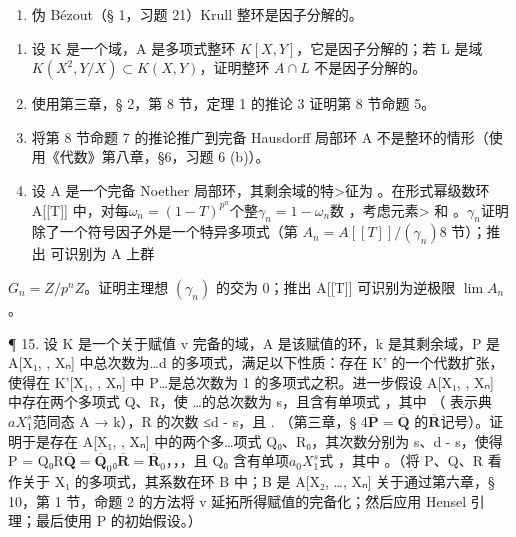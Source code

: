 \begin{enumerate}
\def\labelenumi{(\alph{enumi})}
\setcounter{enumi}{1}
\tightlist
\item
  伪 Bézout（§ 1，习题 21）Krull 整环是因子分解的。
\end{enumerate}

\begin{enumerate}
\def\labelenumi{\arabic{enumi}.}
\setcounter{enumi}{10}
\item
  设 K 是一个域，A 是多项式整环 \(K[X,Y]\)，它是因子分解的；若 L 是域 \(K(X^{2},Y/X) \subset K(X,Y)\)，证明整环 \(A \cap L\) 不是因子分解的。
\item
  使用第三章，§ 2，第 8 节，定理 1 的推论 3 证明第 8 节命题 5。
\item
  将第 8 节命题 7 的推论推广到完备 Hausdorff 局部环 A 不是整环的情形（使用《代数》第八章，§6，习题 6 (b)）。
\item
  设 A 是一个完备 Noether 局部环，其剩余域的特\textgreater{}征为 。在形式幂级数环 A[{}{}[{}{}T]] 中，对每\(\omega_{n} = (1 - T)^{p^{n}}\)个整\(\gamma_{n} = 1 - \omega_{n}\)数 ，考虑元素\textgreater{}  和 。\(\gamma_{n}\)证明  除了一个符号因子外是一个特异多项式（第 \(A_{n} = A[[T]]/(\gamma_{n})\)8 节）；推出  可识别为 A 上群
\end{enumerate}

\(G_{n} = Z/p^{n}Z\)。证明主理想 \((\gamma_{n})\) 的交为 0；推出 A{[}{[}T{]}{]} 可识别为逆极限 \(\lim A_{n}\)。

¶ 15. 设 K 是一个关于赋值 v 完备的域，A 是该赋值的环，k 是其剩余域，P 是 A[X₁, , Xₙ] 中总次{}数为\ldots d{} 的多项式，满足以下性质：存在 K' 的一个代数扩张，使得在 K'[X₁, , Xₙ] 中{} P\ldots {是}总次数为 1 的多项式之积。进一步假设 A[X₁, , Xₙ] 中存在两个多项式 Q、R，{}使 \ldots {}的总次数为 s，且含有单项式 ，其中 （ 表示典\(aX_1^{s}\)范同态 A → k），R 的次数 ≤d - s，且  . （第三章，§ 4\(\overline{\mathbf{P}} = \overline{\mathbf{Q}}\) 的\(\overline{\mathbf{R}}\)记号）。证明于是存在 A[X₁, , Xₙ] 中的两{个}多\ldots 项式{} Q₀、R₀，其次数分别为 s、d - s，使得 P = Q₀R\(\overline{\mathbf{Q}} = \overline{\mathbf{Q}}_0\)₀\(\overline{\mathbf{R}} = \overline{\mathbf{R}}_0\)，，，且 Q₀ 含有单项\(a_0X_1^{s}\)式 ，其中 。（将 P、Q、R 看作关于 X₁ 的多项式，其系数在环 B 中；B 是 A[X₂{}, \ldots, {}Xₙ] 关于通过第六章，§ 10，第 1 节，命题 2 的方法将 v 延拓所得赋值的完备化；然后应用 Hensel 引理；最后使用 P 的初始假设。）

